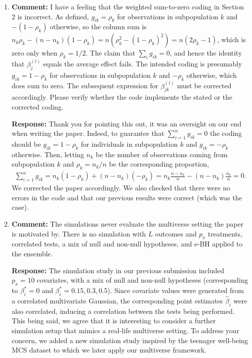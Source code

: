 \documentclass[11pt, a4paper]{article}
\newcommand{\reply}{\vspace{0.3cm} \noindent \textbf{Response:} {\it }}
\begin{document}
\begin{enumerate}[leftmargin=*]
    \item \textbf{Comment:} I have a feeling that the weighted sum-to-zero coding in Section 2 is incorrect. As defined, $g_{ik} = \rho_k$ for observations in subpopulation $k$ and $-(1 - \rho_k)$ otherwise, so the column sum is $n_k\rho_k - (n - n_k)(1 - \rho_k) = n(\rho_k^2 - (1 - \rho_k)^2) = n(2\rho_k - 1)$, which is zero only when $\rho_k = 1/2$. The claim that $\sum_i g_{ik} = 0$, and hence the identity that $\beta_j^{(l)}$ equals the average effect fails. The intended coding is presumably $g_{ik} = 1 - \rho_k$ for observations in subpopulation $k$ and $-\rho_k$ otherwise, which does sum to zero. The subsequent expression for $\beta_{jk}^{(l)}$ must be corrected accordingly. Please verify whether the code implements the stated or the corrected coding.
    
    \reply 
Thank you for pointing this out, it was an oversight on our end when writing the paper. Indeed, to guarantee that $\sum_{i=1}^n g_{ik}=0$ the coding should be $g_{ik}= 1 - \rho_k$ for individuals in subpopulation $k$ and $g_{ik}= -\rho_k$ otherwise. Then, letting $n_k$ be the number of observations coming from subpopulation $k$ and $\rho_k = n_k/n$ be the corresponding proportion, 
\begin{align}
 \sum_{i=1}^n g_{ik}= n_k (1-\rho_k) + (n - n_k) (- \rho_k)= n_k \frac{n - n_k}{n} - (n-n_k) \frac{n_k}{n} = 0.
\nonumber
\end{align}
We corrected the paper accordingly. We also checked that there were no errors in the code and that our previous results were correct (which was the case). 

\vspace{0.5cm}

    \item \textbf{Comment:} The simulations never evaluate the multiverse setting the paper is motivated by. There is no simulation with $L$ outcomes and $p_x$ treatments, correlated tests, a mix of null and non-null hypotheses, and e-BH applied to the ensemble.
    
    \reply The simulation study in our previous submission included $p_x=10$ covariates, with a mix of null and non-null hypotheses (corresponding to $\beta_i^*=0$ and $\beta_i^* = 0.15, 0.3, 0.5$). Since covariate values were generated from a correlated multivariate Gaussian, the corresponding point estimates $\hat{\beta}_i$ were also correlated, inducing a correlation between the tests being performed. This being said, we agree that it is interesting to consider a further simulation setup that mimics a real-life multiverse setting. To address your concern, we added a new simulation study inspired by the teenager well-being MCS dataset to which we later apply our multiverse framework.


\end{enumerate}
\end{document}
